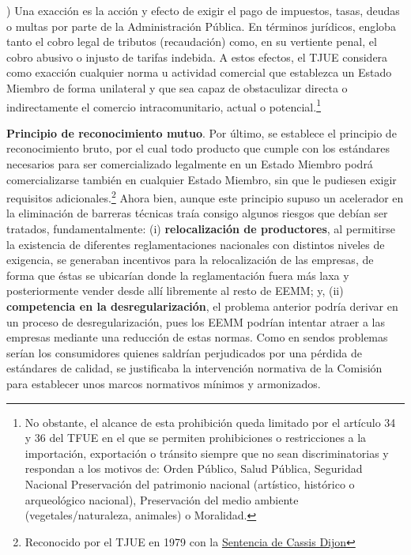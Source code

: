 \documentclass[10pt,a4paper]{article}
\newcounter{alphaitem}
\newenvironment{la}
      {\begin{list}{\alph{alphaitem})}{%
          \usecounter{alphaitem}%
          \setlength{\leftmargin}{1cm}%
          \setlength{\parskip}{3pt}%
          \setlength{\itemsep}{0pt}%
          \setlength{\parsep}{0pt}%
      }}
      {\end{list}}
\begin{document}
\begin{la}
{    Una exacción es la acción y efecto de exigir el pago de impuestos, tasas, deudas o multas por parte de la Administración Pública. En términos jurídicos, engloba tanto el cobro legal de tributos (recaudación) como, en su vertiente penal, el cobro abusivo o injusto de tarifas indebida.
    } A estos efectos, el TJUE considera como exacción cualquier norma u actividad comercial que establezca un Estado Miembro de forma unilateral y que sea capaz de obstaculizar directa o indirectamente el comercio intracomunitario, actual o potencial.\footnote{%
        No obstante, el alcance de esta prohibición queda limitado por el artículo 34 y 36 del TFUE en el que se permiten prohibiciones o restricciones a la importación, exportación o tránsito siempre que no sean discriminatorias y respondan a los motivos de: Orden Público, Salud Pública, Seguridad Nacional Preservación del patrimonio nacional (artístico, histórico o arqueológico nacional), Preservación del medio ambiente (vegetales/naturaleza, animales) o Moralidad.
    }
    \item \textbf{Principio de reconocimiento mutuo}. Por último, se establece el principio de reconocimiento bruto, por el cual todo producto que cumple con los estándares necesarios para ser comercializado legalmente en un Estado Miembro podrá comercializarse también en cualquier Estado Miembro, sin que le pudiesen exigir requisitos adicionales.\footnote{%
        Reconocido por el TJUE en 1979 con la \href{https://eur-lex.europa.eu/legal-content/ES/TXT/?qid=1588620862331&uri=CELEX:61978CJ0120}{Sentencia de Cassis Dijon}
    } Ahora bien, aunque este principio supuso un acelerador en la eliminación de barreras técnicas traía consigo algunos riesgos que debían ser tratados, fundamentalmente: (i) \textbf{relocalización de productores}, al permitirse la existencia de diferentes reglamentaciones nacionales con distintos niveles de exigencia, se generaban incentivos para la relocalización de las empresas, de forma que éstas se ubicarían donde la reglamentación fuera más laxa y posteriormente vender desde allí libremente al resto de EEMM; y, (ii) \textbf{competencia en la desregularización}, el problema anterior podría derivar en un proceso de desregularización, pues los EEMM podrían intentar atraer a las empresas mediante una reducción de estas normas. Como en sendos problemas serían los consumidores quienes saldrían perjudicados por una pérdida de estándares de calidad, se justificaba la intervención normativa de la Comisión para establecer unos marcos normativos mínimos y armonizados.
\end{la}
\end{document}
